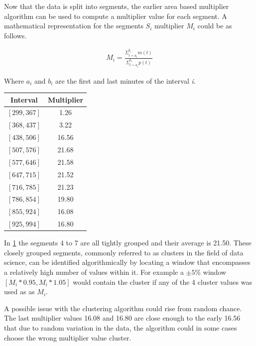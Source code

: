 \noindent Now that the data is split into segments, the earlier area based multiplier algorithm can be used to compute a multiplier value for each segment. A mathematical representation for the segments $S_i$ multiplier $M_i$ could be as follows. 

\begin{align}
	M_i =  \frac{\Sigma_{t=a_i}^{b_i} m(t)}{\Sigma_{t=a_i}^{b_i} p(t)}
\end{align}

\noindent Where $a_i$ and $b_i$ are the first and last minutes of the interval \textit{i}.



\begin{table}[!ht]
\centering
\begin{tabular}{c|c} \hline

Interval & Multiplier\\
\hline
$[299, 367]$ & 1.26 \\
$[368, 437]$ & 3.22 \\
$[438, 506]$ & 16.56 \\
$[507, 576]$ & 21.68 \\
$[577, 646]$ & 21.58 \\
$[647, 715]$ & 21.52 \\
$[716, 785]$ & 21.23 \\
$[786, 854]$ & 19.80 \\
$[855, 924]$ & 16.08 \\
$[925, 994]$ & 16.80 \\
\hline\hline
\end{tabular}
\label{table_segmentmatch1}
\end{table}

\vspace{10mm}

\noindent In \ref{table_segmentmatch1} the segments 4 to 7 are all tightly grouped and their average is 21.50. These closely grouped segments, commonly referred to as clusters in the field of data science, can be identified algorithmically by locating a window that encompasses a relatively high number of values within it. For example a $\pm 5\%$ window $[M_i*0.95, M_i*1.05]$ would contain the cluster if any of the 4 cluster values was used as as $M_i$.

A possible issue with the clustering algorithm could rise from random chance. The last multiplier values 16.08 and 16.80 are close enough to the early 16.56 that due to random variation in the data, the algorithm could in some cases choose the wrong multiplier value cluster. %


